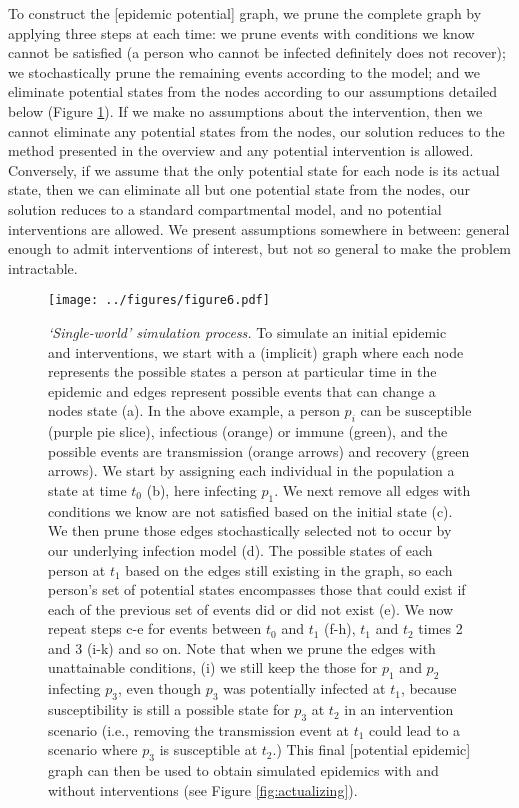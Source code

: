 \documentclass[PTRSB]{rsos}
\makeatletter
\def\checkGraphicsWidth{\ifdim\Gin@nat@width>\linewidth
	\tsGraphicsScaleX\linewidth\else\Gin@nat@width\fi}
\let\ts@includegraphics\includegraphics
\renewcommand{\includegraphics}[1]{\ts@includegraphics[width=\checkGraphicsWidth]{#1}}
\makeatother
\begin{document}
\begin{multicols}{2}
To construct the [epidemic potential] graph, we prune the complete graph by applying three steps at each time: we prune events with conditions we know cannot be satisfied (a person who cannot be infected definitely does not recover); we stochastically prune the remaining events according to the model; and we eliminate potential states from the nodes according to our assumptions detailed below (Figure \ref{fig:pruning}).
If we make no assumptions about the intervention, then we cannot eliminate any potential states from the nodes, our solution reduces to the method presented in the overview and any potential intervention is allowed.
Conversely, if we assume that the only potential state for each node is its actual state, then we can eliminate all but one potential state from the nodes, our solution reduces to a standard compartmental model, and no potential interventions are allowed.
We present assumptions somewhere in between: general enough to admit interventions of interest, but not so general to make the problem intractable.

\begin{figure}[hp]
\texttt{[image: ../figures/figure6.pdf]}
\caption{\textit{‘Single-world’ simulation process.}
  To simulate an initial epidemic and interventions, we start with a (implicit) graph where each node represents the possible states a person at particular time in the epidemic and edges represent possible events that can change a nodes state (a).
  In the above example, a person $p_i$ can be susceptible (purple pie slice), infectious (orange) or immune (green), and the possible events are transmission (orange arrows) and recovery (green arrows).
  We start by assigning each individual in the population a state at time $t_0$ (b), here infecting $p_1$.
  We next remove all edges with conditions we know are not satisfied based on the initial state (c).
  We then prune those edges stochastically selected not to occur by our underlying infection model (d).
  The possible states of each person at $t_1$ based on the edges still existing in the graph, so each person’s set of potential states encompasses those that could exist if each of the previous set of events did or did not exist (e).
  We now repeat steps c-e for events between $t_0$ and $t_1$ (f-h), $t_1$ and $t_2$ times 2 and 3 (i-k) and so on.
  Note that when we prune the edges with unattainable conditions, (i) we still keep the those for $p_1$ and $p_2$ infecting $p_3$, even though $p_3$ was potentially infected at $t_1$, because susceptibility is still a possible state for $p_3$ at $t_2$ in an intervention scenario (i.e., removing the transmission event at $t_1$ could lead to a scenario where $p_3$ is susceptible at $t_2$.)
  This final [potential epidemic] graph can then be used to obtain simulated epidemics with and without interventions (see Figure \ref{fig:actualizing}).
}
\label{fig:pruning}
\end{figure}


\end{multicols}
\end{document}
